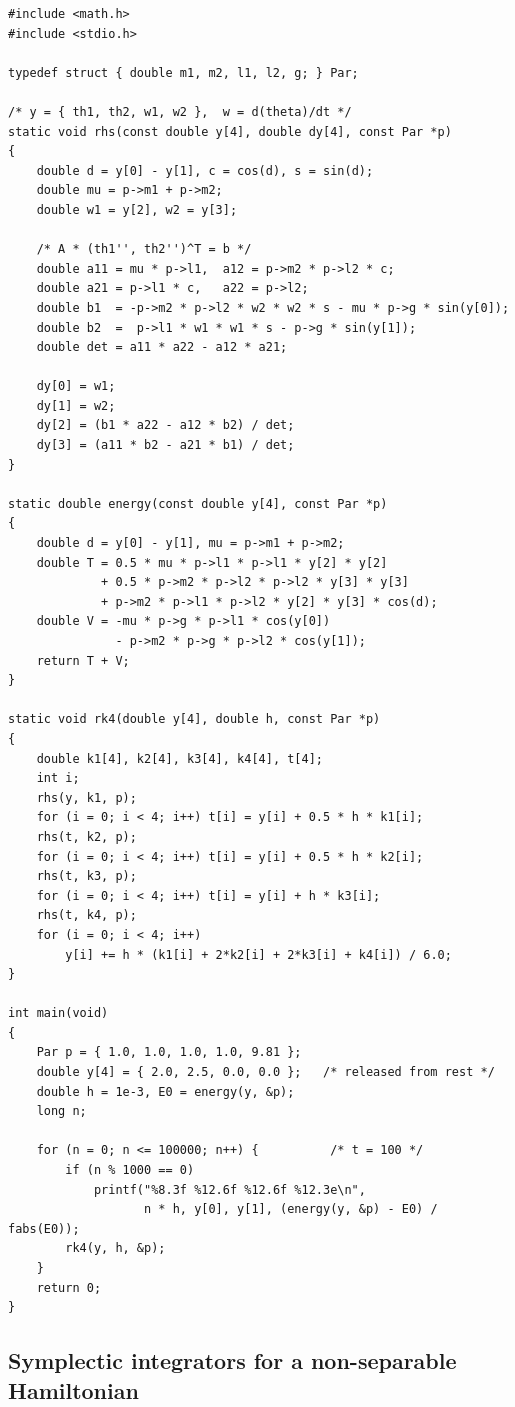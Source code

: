 \documentclass[11pt,a4paper]{book}
\theoremstyle{definition}
\theoremstyle{remark}
\begin{document}
\begin{lstlisting}
#include <math.h>
#include <stdio.h>

typedef struct { double m1, m2, l1, l2, g; } Par;

/* y = { th1, th2, w1, w2 },  w = d(theta)/dt */
static void rhs(const double y[4], double dy[4], const Par *p)
{
    double d = y[0] - y[1], c = cos(d), s = sin(d);
    double mu = p->m1 + p->m2;
    double w1 = y[2], w2 = y[3];

    /* A * (th1'', th2'')^T = b */
    double a11 = mu * p->l1,  a12 = p->m2 * p->l2 * c;
    double a21 = p->l1 * c,   a22 = p->l2;
    double b1  = -p->m2 * p->l2 * w2 * w2 * s - mu * p->g * sin(y[0]);
    double b2  =  p->l1 * w1 * w1 * s - p->g * sin(y[1]);
    double det = a11 * a22 - a12 * a21;

    dy[0] = w1;
    dy[1] = w2;
    dy[2] = (b1 * a22 - a12 * b2) / det;
    dy[3] = (a11 * b2 - a21 * b1) / det;
}

static double energy(const double y[4], const Par *p)
{
    double d = y[0] - y[1], mu = p->m1 + p->m2;
    double T = 0.5 * mu * p->l1 * p->l1 * y[2] * y[2]
             + 0.5 * p->m2 * p->l2 * p->l2 * y[3] * y[3]
             + p->m2 * p->l1 * p->l2 * y[2] * y[3] * cos(d);
    double V = -mu * p->g * p->l1 * cos(y[0])
               - p->m2 * p->g * p->l2 * cos(y[1]);
    return T + V;
}

static void rk4(double y[4], double h, const Par *p)
{
    double k1[4], k2[4], k3[4], k4[4], t[4];
    int i;
    rhs(y, k1, p);
    for (i = 0; i < 4; i++) t[i] = y[i] + 0.5 * h * k1[i];
    rhs(t, k2, p);
    for (i = 0; i < 4; i++) t[i] = y[i] + 0.5 * h * k2[i];
    rhs(t, k3, p);
    for (i = 0; i < 4; i++) t[i] = y[i] + h * k3[i];
    rhs(t, k4, p);
    for (i = 0; i < 4; i++)
        y[i] += h * (k1[i] + 2*k2[i] + 2*k3[i] + k4[i]) / 6.0;
}

int main(void)
{
    Par p = { 1.0, 1.0, 1.0, 1.0, 9.81 };
    double y[4] = { 2.0, 2.5, 0.0, 0.0 };   /* released from rest */
    double h = 1e-3, E0 = energy(y, &p);
    long n;

    for (n = 0; n <= 100000; n++) {          /* t = 100 */
        if (n % 1000 == 0)
            printf("%8.3f %12.6f %12.6f %12.3e\n",
                   n * h, y[0], y[1], (energy(y, &p) - E0) / fabs(E0));
        rk4(y, h, &p);
    }
    return 0;
}
\end{lstlisting}

\subsection{Symplectic integrators for a non-separable Hamiltonian}
\label{sec:symplectic}
\end{document}
